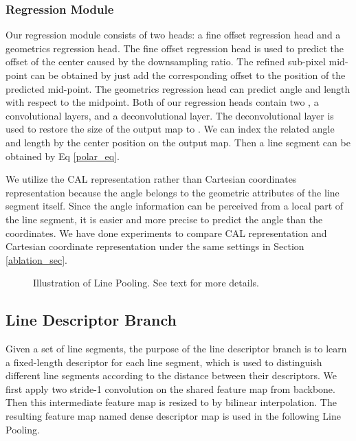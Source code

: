 \documentclass[10pt,twocolumn,letterpaper]{article}
\begin{document}
\subsubsection{Regression Module} \label{polar_sec}
Our regression module consists of two heads: a fine offset regression head and a geometrics regression head. The fine offset regression head is used to predict the offset of the center caused by the downsampling ratio. The refined sub-pixel mid-point can be obtained by just add the corresponding offset to the position of the predicted mid-point. The geometrics regression head can predict angle and length with respect to the midpoint. Both of our regression heads contain two , a  convolutional layers, and a deconvolutional layer. The deconvolutional layer is used to restore the size of the output map to . We can index the related angle  and length  by the center position  on the output map. Then a line segment can be obtained by Eq \ref{polar_eq}.


We utilize the CAL representation rather than Cartesian coordinates representation because the angle belongs to the geometric attributes of the line segment itself. Since the angle information can be perceived from a local part of the line segment, it is easier and more precise to predict the angle than the coordinates. We have done experiments to compare CAL representation and Cartesian coordinate representation under the same settings in Section \ref{ablation_sec}.

\begin{figure}[t]
	\begin{center}
	\end{center}
	\caption{Illustration of Line Pooling. See text for more details.}
	\label{linepooling}
\end{figure}
\subsection{Line Descriptor Branch}
Given a set of line segments, the purpose of the line descriptor branch is to learn a fixed-length descriptor for each line segment, which is used to distinguish different line segments according to the distance between their descriptors. We first apply two   stride-1 convolution on the shared feature map from backbone. Then this intermediate feature map is resized to  by bilinear interpolation. The resulting feature map named dense descriptor map is used in the following Line Pooling.
\end{document}
